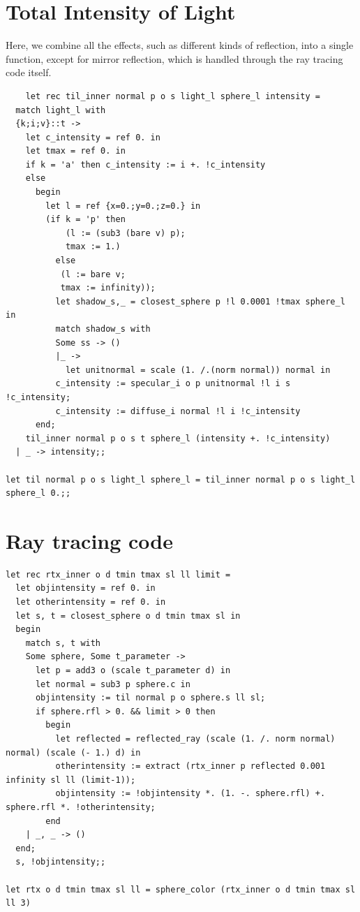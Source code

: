 \documentclass[conference]{IEEEtran}
\begin{document}
\section{Total Intensity of Light}

Here, we combine all the effects, such as different kinds of reflection, into a single function, except for mirror reflection, which is handled through the ray tracing code itself.


\begin{lstlisting}
    let rec til_inner normal p o s light_l sphere_l intensity = 
  match light_l with 
  {k;i;v}::t -> 
    let c_intensity = ref 0. in
    let tmax = ref 0. in 
    if k = 'a' then c_intensity := i +. !c_intensity 
    else 
      begin
        let l = ref {x=0.;y=0.;z=0.} in
        (if k = 'p' then
            (l := (sub3 (bare v) p); 
            tmax := 1.)
          else  
           (l := bare v;
           tmax := infinity));
          let shadow_s,_ = closest_sphere p !l 0.0001 !tmax sphere_l in 
          match shadow_s with 
          Some ss -> ()
          |_ -> 
            let unitnormal = scale (1. /.(norm normal)) normal in 
          c_intensity := specular_i o p unitnormal !l i s !c_intensity;
          c_intensity := diffuse_i normal !l i !c_intensity
      end;
    til_inner normal p o s t sphere_l (intensity +. !c_intensity)
  | _ -> intensity;;

let til normal p o s light_l sphere_l = til_inner normal p o s light_l sphere_l 0.;;
\end{lstlisting} 

\section{Ray tracing code}

\begin{lstlisting}
let rec rtx_inner o d tmin tmax sl ll limit =
  let objintensity = ref 0. in 
  let otherintensity = ref 0. in  
  let s, t = closest_sphere o d tmin tmax sl in 
  begin
    match s, t with 
    Some sphere, Some t_parameter ->
      let p = add3 o (scale t_parameter d) in 
      let normal = sub3 p sphere.c in
      objintensity := til normal p o sphere.s ll sl;
      if sphere.rfl > 0. && limit > 0 then
        begin
          let reflected = reflected_ray (scale (1. /. norm normal) normal) (scale (- 1.) d) in 
          otherintensity := extract (rtx_inner p reflected 0.001 infinity sl ll (limit-1));
          objintensity := !objintensity *. (1. -. sphere.rfl) +. sphere.rfl *. !otherintensity;
        end
    | _, _ -> ()
  end; 
  s, !objintensity;;

let rtx o d tmin tmax sl ll = sphere_color (rtx_inner o d tmin tmax sl ll 3)
\end{lstlisting}
\end{document}
